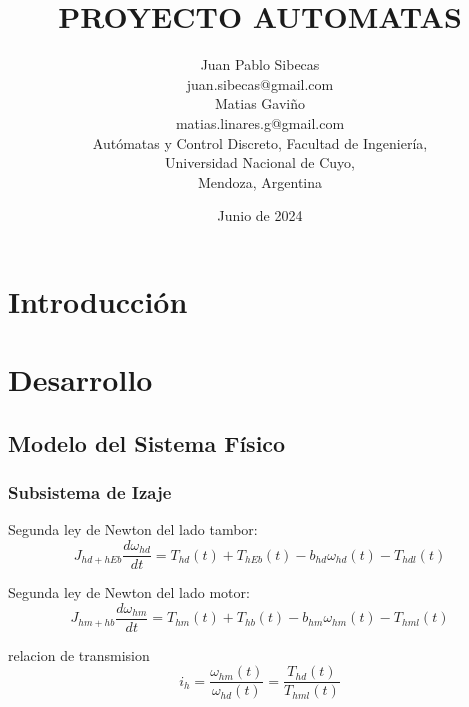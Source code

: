 \documentclass{article}
\title{PROYECTO AUTOMATAS}
\author{Juan Pablo Sibecas \\ juan.sibecas@gmail.com \\Matias Gaviño\\ matias.linares.g@gmail.com \\ Autómatas y Control Discreto, Facultad de Ingeniería, \\ Universidad Nacional de Cuyo, \\ Mendoza, Argentina}
\date{Junio de 2024}
\begin{document}
\renewcommand{\tablename}{Tabla}

\maketitle

\begin{abstract}\label{sec:abstract}

\end{abstract}

\newpage

\section{Introducción} \label{sec:intro}

\section{Desarrollo} \label{sec:desarrollo}
    \subsection{Modelo del Sistema Físico} \label{sec:plantModel}

        \subsubsection{Subsistema de Izaje}
            Segunda ley de Newton del lado tambor:
            \begin{equation} \label{eq:tamborIzaje}
                J_{hd+hEb} \frac{d \omega_{hd}}{dt} = T_{hd}(t) + T_{hEb}(t) - b_{hd} \omega_{hd}(t) - T_{hdl}(t)
            \end{equation}

            Segunda ley de Newton del lado motor:
            \begin{equation} \label{eq:motorIzaje}
                J_{hm+hb} \frac{d \omega_{hm}}{dt} = T_{hm}(t) + T_{hb}(t) - b_{hm} \omega_{hm}(t) - T_{hml}(t)
            \end{equation}

            relacion de transmision
            \begin{equation} \label{eq:transmisionIzaje}
                i_h = \frac{\omega_{hm}(t)}{\omega_{hd}(t)} = \frac{T_{hd}(t)}{T_{hml}(t)}
            \end{equation}
\end{document}
